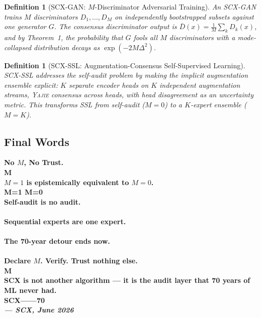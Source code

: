 \documentclass[12pt,a4paper]{article}
\newtheorem{definition}[theorem]{Definition}
\theoremstyle{definition}
\newcommand{\Yajie}{\textsc{Yajie}}
\newcommand{\SCX}{\textsc{SCX}}
\begin{document}
\begin{definition}[SCX-GAN: $M$-Discriminator Adversarial Training]\label{def:scx_gan}
An \SCX{}-GAN trains $M$ discriminators $D_1, \ldots, D_M$ on independently bootstrapped subsets against one generator $G$. The consensus discriminator output is $\bar{D}(x) = \frac{1}{M}\sum_k D_k(x)$, and by Theorem~1, the probability that $G$ fools all $M$ discriminators with a mode-collapsed distribution decays as $\exp(-2M\Delta^2)$.
\end{definition}

\begin{definition}[SCX-SSL: Augmentation-Consensus Self-Supervised Learning]\label{def:scx_ssl}
\SCX{}-SSL addresses the self-audit problem by making the implicit augmentation ensemble explicit: $K$ separate encoder heads on $K$ independent augmentation streams, \Yajie{} consensus across heads, with head disagreement as an uncertainty metric. This transforms SSL from self-audit ($M=0$) to a $K$-expert ensemble ($M=K$).
\end{definition}

\subsection{Final Words }

\vspace{12pt}
\begin{center}
\large\bfseries
No $M$, No Trust.\\[2pt]
M\\[8pt]
$M=1$ is epistemically equivalent to $M=0$.\\[2pt]
M=1  M=0\\[8pt]
Self-audit is no audit.\\[2pt]
\\[8pt]
Sequential experts are one expert.\\[2pt]
\\[8pt]
The 70-year detour ends now.\\[2pt]
\\[8pt]
Declare $M$. Verify. Trust nothing else.\\[2pt]
M\\[16pt]

\LARGE\bfseries
SCX is not another algorithm — it is the audit layer that 70 years of ML never had.\\[4pt]
SCX——70\\[16pt]

\normalsize
\textit{— SCX, June 2026}
\end{center}
\end{document}
